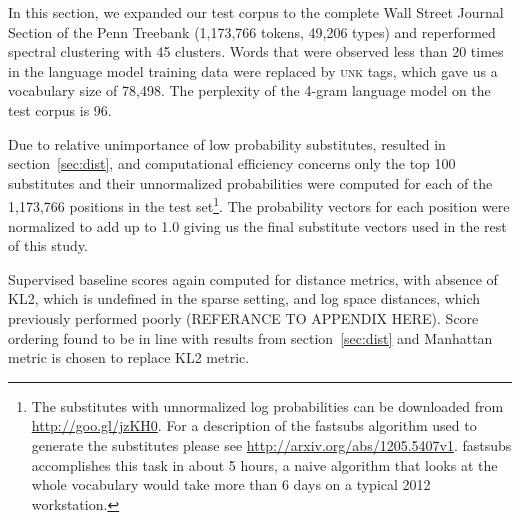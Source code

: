 In this section, we expanded our test corpus to the complete Wall
Street Journal Section of the Penn Treebank \cite{treebank3}
(1,173,766 tokens, 49,206 types) and reperformed spectral clustering
with 45 clusters.
%
Words that were observed less than 20 times in the language model
training data were replaced by \textsc{unk} tags, which gave us a
vocabulary size of 78,498.
%
The perplexity of the 4-gram language model on the test corpus is 96.

Due to relative unimportance of low probability substitutes, resulted
in section~\ref{sec:dist}, and computational efficiency concerns only
the top 100 substitutes and their unnormalized probabilities were
computed for each of the 1,173,766 positions in the test
set\footnote{The substitutes with unnormalized log probabilities can
  be downloaded from \mbox{\url{http://goo.gl/jzKH0}}.  For a
  description of the {\sc fastsubs} algorithm used to generate the
  substitutes please see
  \mbox{\url{http://arxiv.org/abs/1205.5407v1}}.  {\sc fastsubs}
  accomplishes this task in about 5 hours, a naive algorithm that
  looks at the whole vocabulary would take more than 6 days on a
  typical 2012 workstation.}.  The probability vectors for each
position were normalized to add up to 1.0 giving us the final
substitute vectors used in the rest of this study.

Supervised baseline scores again computed for distance metrics, with
absence of KL2, which is undefined in the sparse setting, and log
space distances, which previously performed poorly (REFERANCE TO
APPENDIX HERE). Score ordering found to be in line with results from
section~\ref{sec:dist} and Manhattan metric is chosen to replace KL2
metric.


